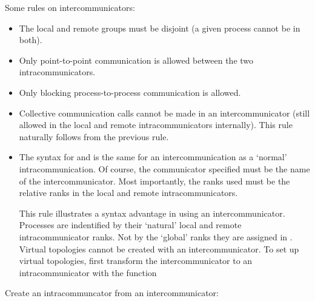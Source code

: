 Some rules on intercommunicators:
\begin{itemize}
\item The local and remote groups must be disjoint (a given process
  cannot be in both).
\item
  Only point-to-point communication is allowed between the two
  intracommunicators.%
\item 
  Only blocking process-to-process communication is allowed.
\item 
  Collective communication calls cannot be made in an
  intercommunicator (still allowed in the local and remote
  intracommunicators internally). This rule naturally follows from the
  previous rule.
\item 
  The syntax for  and 
  is the same for an intercommunication as a `normal'
  intracommunication. Of course, the communicator specified must be
  the name of the intercommunicator. Most importantly, the ranks used
  must be the relative ranks in the local and remote
  intracommunicators.

  This rule illustrates a syntax advantage in using an
  intercommunicator. Processes are indentified by their `natural'
  local and remote intracommunicator ranks. Not by the `global'
  ranks they are assigned in .  Virtual topologies
  cannot be created with an intercommunicator. To set up virtual
  topologies, first transform the intercommunicator to an
  intracommunicator with the function
\end{itemize}

Create an intracommuncator from an intercommunicator:
